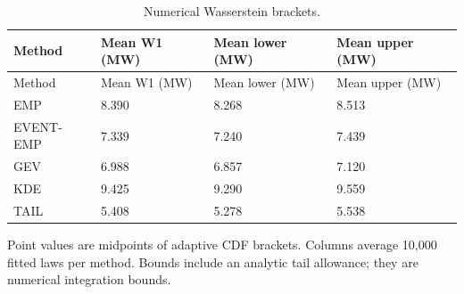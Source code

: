 \begingroup
\fontsize{8.5}{10.5}\selectfont\setlength{\tabcolsep}{3pt}
\begin{longtable}{@{}llll@{}}
\caption{Numerical Wasserstein brackets.}\label{tab:final-si-6}\\
\toprule
Method & Mean W1 (MW) & Mean lower (MW) & Mean upper (MW)\\\midrule\endfirsthead
Method & Mean W1 (MW) & Mean lower (MW) & Mean upper (MW)\\\midrule\endhead
EMP & 8.390 & 8.268 & 8.513\\
EVENT-EMP & 7.339 & 7.240 & 7.439\\
GEV & 6.988 & 6.857 & 7.120\\
KDE & 9.425 & 9.290 & 9.559\\
TAIL & 5.408 & 5.278 & 5.538\\
\bottomrule
\end{longtable}
\noindent\footnotesize Point values are midpoints of adaptive CDF brackets. Columns average 10,000 fitted laws per method. Bounds include an analytic tail allowance; they are numerical integration bounds.
\endgroup

